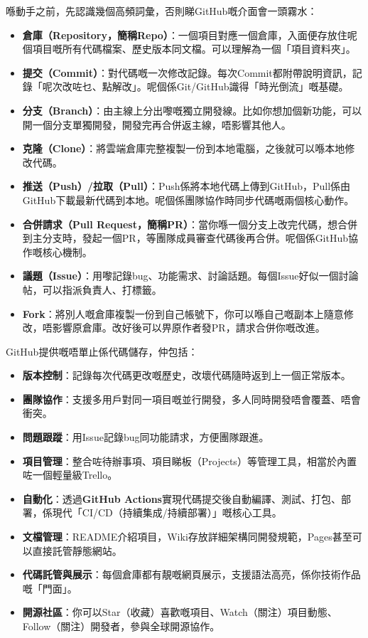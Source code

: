 
喺動手之前，先認識幾個高頻詞彙，否則睇GitHub嘅介面會一頭霧水：

\begin{itemize}
  \item \textbf{倉庫（Repository，簡稱Repo）}：一個項目對應一個倉庫，入面便存放住呢個項目嘅所有代碼檔案、歷史版本同文檔。可以理解為一個「項目資料夾」。
  \item \textbf{提交（Commit）}：對代碼嘅一次修改記錄。每次Commit都附帶說明資訊，記錄「呢次改咗乜、點解改」。呢個係Git/GitHub識得「時光倒流」嘅基礎。
  \item \textbf{分支（Branch）}：由主線上分出嚟嘅獨立開發線。比如你想加個新功能，可以開一個分支單獨開發，開發完再合併返主線，唔影響其他人。
  \item \textbf{克隆（Clone）}：將雲端倉庫完整複製一份到本地電腦，之後就可以喺本地修改代碼。
  \item \textbf{推送（Push）/拉取（Pull）}：Push係將本地代碼上傳到GitHub，Pull係由GitHub下載最新代碼到本地。呢個係團隊協作時同步代碼嘅兩個核心動作。
  \item \textbf{合併請求（Pull Request，簡稱PR）}：當你喺一個分支上改完代碼，想合併到主分支時，發起一個PR，等團隊成員審查代碼後再合併。呢個係GitHub協作嘅核心機制。
  \item \textbf{議題（Issue）}：用嚟記錄bug、功能需求、討論話題。每個Issue好似一個討論帖，可以指派負責人、打標籤。
  \item \textbf{Fork}：將別人嘅倉庫複製一份到自己帳號下，你可以喺自己嘅副本上隨意修改，唔影響原倉庫。改好後可以畀原作者發PR，請求合併你嘅改進。
\end{itemize}


GitHub提供嘅唔單止係代碼儲存，仲包括：

\begin{itemize}
  \item \textbf{版本控制}：記錄每次代碼更改嘅歷史，改壞代碼隨時返到上一個正常版本。
  \item \textbf{團隊協作}：支援多用戶對同一項目嘅並行開發，多人同時開發唔會覆蓋、唔會衝突。
  \item \textbf{問題跟蹤}：用Issue記錄bug同功能請求，方便團隊跟進。
  \item \textbf{項目管理}：整合咗待辦事項、項目睇板（Projects）等管理工具，相當於內置咗一個輕量級Trello。
  \item \textbf{自動化}：透過\textbf{GitHub Actions}實現代碼提交後自動編譯、測試、打包、部署，係現代「CI/CD（持續集成/持續部署）」嘅核心工具。
  \item \textbf{文檔管理}：README介紹項目，Wiki存放詳細架構同開發規範，Pages甚至可以直接託管靜態網站。
  \item \textbf{代碼託管與展示}：每個倉庫都有靚嘅網頁展示，支援語法高亮，係你技術作品嘅「門面」。
  \item \textbf{開源社區}：你可以Star（收藏）喜歡嘅項目、Watch（關注）項目動態、Follow（關注）開發者，參與全球開源協作。
\end{itemize}

